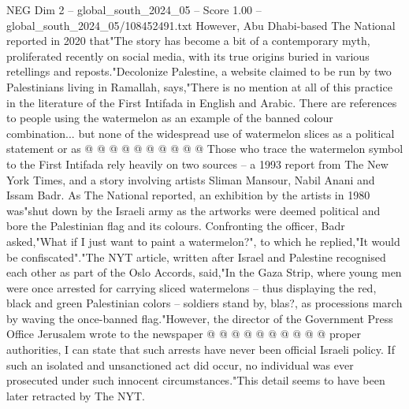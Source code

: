 \begin{textsample}{NEG Dim 2 – global\_south\_2024\_05 – Score 1.00 – global\_south\_2024\_05/108452491.txt}
However, Abu Dhabi-based The National reported in 2020 that"The story has become a bit of a contemporary myth, proliferated recently on social media, with its true origins buried in various retellings and reposts."Decolonize Palestine, a website claimed to be run by two Palestinians living in Ramallah, says,"There is no mention at all of this practice in the literature of the First Intifada in English and Arabic.
There are references to people using the watermelon as an example of the banned colour combination... but none of the widespread use of watermelon slices as a political statement or as @ @ @ @ @ @ @ @ @ @ Those who trace the watermelon symbol to the First Intifada rely heavily on two sources -- a 1993 report from The New York Times, and a story involving artists Sliman Mansour, Nabil Anani and Issam Badr.
As The National reported, an exhibition by the artists in 1980 was"shut down by the Israeli army as the artworks were deemed political and bore the Palestinian flag and its colours.
Confronting the officer, Badr asked,"What if I just want to paint a watermelon?", to which he replied,"It would be confiscated"."The NYT article, written after Israel and Palestine recognised each other as part of the Oslo Accords, said,"In the Gaza Strip, where young men were once arrested for carrying sliced watermelons -- thus displaying the red, black and green Palestinian colors -- soldiers stand by, blas?, as processions march by waving the once-banned flag."However, the director of the Government Press Office Jerusalem wrote to the newspaper @ @ @ @ @ @ @ @ @ @ proper authorities, I can state that such arrests have never been official Israeli policy.
If such an isolated and unsanctioned act did occur, no individual was ever prosecuted under such innocent circumstances."This detail seems to have been later retracted by The NYT.

\end{textsample}

